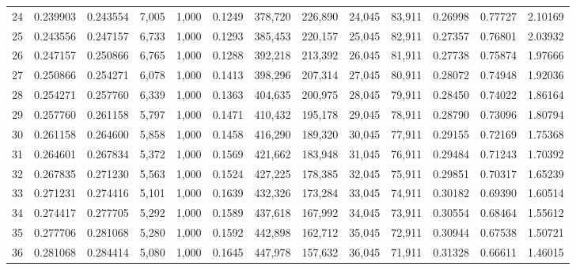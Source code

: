 \begin{tabular}{rrrrrrrrrrrrr}
24  &  0.239903 &  0.243554 &   7,005 &  1,000 &                                     0.1249 &  378,720 &  226,890 &   24,045 &   83,911 &  0.26998 &  0.77727 &  2.10169 \\
25  &  0.243556 &  0.247157 &   6,733 &  1,000 &                                     0.1293 &  385,453 &  220,157 &   25,045 &   82,911 &  0.27357 &  0.76801 &  2.03932 \\
26  &  0.247157 &  0.250866 &   6,765 &  1,000 &                                     0.1288 &  392,218 &  213,392 &   26,045 &   81,911 &  0.27738 &  0.75874 &  1.97666 \\
27  &  0.250866 &  0.254271 &   6,078 &  1,000 &                                     0.1413 &  398,296 &  207,314 &   27,045 &   80,911 &  0.28072 &  0.74948 &  1.92036 \\
28  &  0.254271 &  0.257760 &   6,339 &  1,000 &                                     0.1363 &  404,635 &  200,975 &   28,045 &   79,911 &  0.28450 &  0.74022 &  1.86164 \\
29  &  0.257760 &  0.261158 &   5,797 &  1,000 &                                     0.1471 &  410,432 &  195,178 &   29,045 &   78,911 &  0.28790 &  0.73096 &  1.80794 \\
30  &  0.261158 &  0.264600 &   5,858 &  1,000 &                                     0.1458 &  416,290 &  189,320 &   30,045 &   77,911 &  0.29155 &  0.72169 &  1.75368 \\
31  &  0.264601 &  0.267834 &   5,372 &  1,000 &                                     0.1569 &  421,662 &  183,948 &   31,045 &   76,911 &  0.29484 &  0.71243 &  1.70392 \\
32  &  0.267835 &  0.271230 &   5,563 &  1,000 &                                     0.1524 &  427,225 &  178,385 &   32,045 &   75,911 &  0.29851 &  0.70317 &  1.65239 \\
33  &  0.271231 &  0.274416 &   5,101 &  1,000 &                                     0.1639 &  432,326 &  173,284 &   33,045 &   74,911 &  0.30182 &  0.69390 &  1.60514 \\
34  &  0.274417 &  0.277705 &   5,292 &  1,000 &                                     0.1589 &  437,618 &  167,992 &   34,045 &   73,911 &  0.30554 &  0.68464 &  1.55612 \\
35  &  0.277706 &  0.281068 &   5,280 &  1,000 &                                     0.1592 &  442,898 &  162,712 &   35,045 &   72,911 &  0.30944 &  0.67538 &  1.50721 \\
36  &  0.281068 &  0.284414 &   5,080 &  1,000 &                                     0.1645 &  447,978 &  157,632 &   36,045 &   71,911 &  0.31328 &  0.66611 &  1.46015 \\

\end{tabular}

